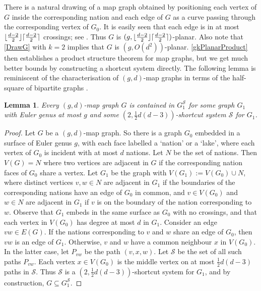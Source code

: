 \documentclass{patmorin}
\theoremstyle{plain}
\newtheorem{lem}[thm]{Lemma}
\theoremstyle{definition}
\newcommand{\note}[2]{\noindent{\color{red}[#1:~#2]}}
\DeclarePairedDelimiter{\ceil}{\lceil}{\rceil}
\DeclarePairedDelimiter{\floor}{\lfloor}{\rfloor}
\renewcommand{\SS}{\mathcal{S}}
\renewcommand{\geq}{\geqslant}
\begin{document}
\note{DW}{give a better version of \cref{MapPartition} with $g=0$. }


There is a natural drawing of a map graph obtained by positioning each vertex of $G$ inside the corresponding nation and each edge of $G$ as a curve passing through the corresponding vertex of $G_0$. It is easily seen that each edge is in at most $\floor{\frac{d-2}{2}}\ceil{\frac{d-2}{2}}$ crossings; see \citep{dujmovic.eppstein.ea:structure}. Thus $G$ is $(g,\floor{\frac{d-2}{2}}\ceil{\frac{d-2}{2}})$-planar. Also note that \cref{DrawG} with $k=2$ implies that $G$ is $(g, O(d^{2}) )$-planar. \cref{gkPlanarProduct} then establishes a product structure theorem for map graphs, but we get much better bounds by constructing a shortcut system directly.  The following lemma is reminiscent of the characterisation of $(g,d)$-map graphs in terms of the half-square of bipartite graphs \citep{CGP02,dujmovic.eppstein.ea:structure}.

\begin{lem}
\label{MapShortcut}
Every $(g,d)$-map graph $G$ is contained in $G_1^\SS$ for some graph $G_1$ with Euler genus at most $g$ and some $(2,\tfrac12 d(d-3) )$-shortcut system $\SS$ for $G_1$.
\end{lem}

\begin{proof}
Let $G$ be a $(g,d)$-map graph. So there is a graph $G_0$ embedded in a surface of Euler genus $g$, with each face labelled a `nation' or a `lake', where each vertex of $G_0$ is incident with at most $d$ nations. Let $N$ be the set of nations. Then $V(G)=N$ where two vertices are adjacent in $G$ if the corresponding nation faces of $G_0$ share a vertex. Let $G_1$ be the graph with $V(G_1):=V(G_0) \cup N$, where distinct vertices $v,w\in N$ are adjacent in $G_1$ if the boundaries of the corresponding nations have an edge of $G_0$ in common, and $v\in V(G_0)$ and $w\in N$ are adjacent in $G_1$ if $v$ is on the boundary of the nation corresponding to $w$. Observe that $G_1$ embeds in the same surface as $G_0$ with no crossings, and that each vertex in $V(G_0)$ has degree at most $d$ in $G_1$. Consider an edge $vw\in E(G)$. If the nations corresponding to $v$ and $w$ share an edge of $G_0$, then $vw$ is an edge of $G_1$. Otherwise,  $v$ and $w$ have a common neighbour $x$ in $V(G_0)$. In the latter case, let $P_{vw}$ be the path $(v,x,w)$. Let $\SS$ be the set of all such paths $P_{vw}$. Each vertex $x\in V(G_0)$ is the middle vertex on at most $\tfrac12 d(d-3)$  paths in $\SS$. Thus $\SS$ is a $(2,\tfrac12 d(d-3))$-shortcut system for $G_1$, and by construction, $G \subseteq G_1^\SS$.
\end{proof}
\end{document}
